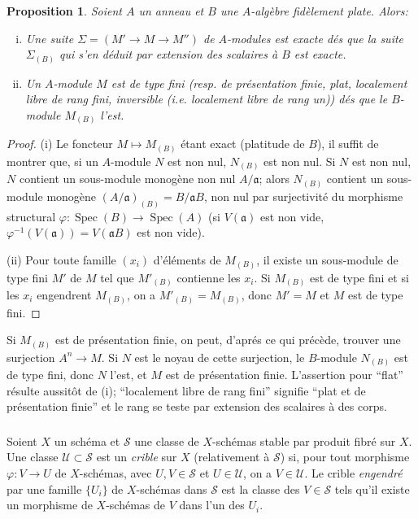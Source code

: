 \documentclass{article}
\DeclareMathOperator{\spec}{Spec}
\newcommand{\cS}{\mathcal{S}}
\newcommand{\cU}{\mathcal{U}}
\newcommand{\fa}{\mathfrak{a}}
\newtheorem{proposition}[subsubsection]{Proposition}
\begin{document}
\begin{proposition}\label{1-4-2}
Soient $A$ un anneau et $B$ une $A$-algèbre fidèlement plate. Alors:
\begin{enumerate}[(i)]
  \item Une suite $\Sigma=(M'\to M\to M'')$ de $A$-modules est exacte dés 
    que la suite $\Sigma_{(B)}$ qui s'en déduit par extension des scalaires 
    à $B$ est exacte.
  \item Un $A$-module $M$ est de type fini (resp. de présentation finie, 
    plat, localement libre de rang fini, inversible (i.e. localement libre 
    de rang un)) dés que le $B$-module $M_{(B)}$ l'est.
\end{enumerate}
\end{proposition}
\begin{proof}
(i) Le foncteur $M\mapsto M_{(B)}$ étant exact (platitude de $B$), il suffit 
de montrer que, si un $A$-module $N$ est non nul, $N_{(B)}$ est non nul. Si 
$N$ est non nul, $N$ contient un sous-module monogène non nul $A/\fa$; alors 
$N_{(B)}$ contient un sous-module monogène $(A/\fa)_{(B)} = B/\fa B$, non nul 
par surjectivité du morphisme structural $\varphi:\spec(B)\to\spec(A)$ (si 
$V(\fa)$ est non vide, $\varphi^{-1}(V(\fa))=V(\fa B)$ est non vide). 

(ii) Pour toute famille $(x_i)$ d'éléments de $M_{(B)}$, il existe un 
sous-module de type fini $M'$ de $M$ tel que $M'_{(B)}$ contienne les $x_i$. Si 
$M_{(B)}$ est de type fini et si les $x_i$ engendrent $M_{(B)}$, on a 
$M'_{(B)}=M_{(B)}$, donc $M'=M$ et $M$ est de type fini. 
\end{proof}

Si $M_{(B)}$ est de présentation finie, on peut, d'aprés ce qui précède, 
trouver une surjection $A^n\to M$. Si $N$ est le noyau de cette surjection, le 
$B$-module $N_{(B)}$ est de type fini, donc $N$ l'est, et $M$ est de 
présentation finie. L'assertion pour ``flat'' résulte aussitôt de (i); 
``localement libre de rang fini'' signifie ``plat et de présentation finie'' 
et le rang se teste par extension des scalaires à des corps.





\subsubsection{}\label{1-4-3}

Soient $X$ un schéma et $\cS$ une classe de $X$-schémas stable par produit 
fibré sur $X$. Une classe $\cU\subset \cS$ est un \emph{crible} sur $X$ 
(relativement à $\cS$) si, pour tout morphisme $\varphi:V\to U$ de 
$X$-schémas, avec $U,V\in \cS$ et $U\in\cU$, on a $V\in \cU$. Le crible 
\emph{engendré} par une famille $\{U_i\}$ de $X$-schémas dans $\cS$ est la 
classe des $V\in\cS$ tels qu'il existe un morphisme de $X$-schémas de $V$ dans 
l'un des $U_i$. 
\end{document}
